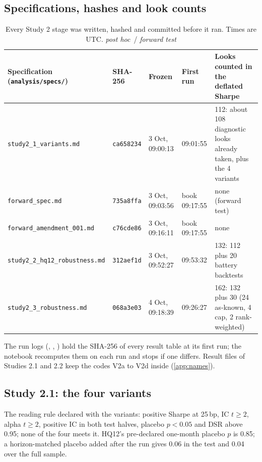 \documentclass[11pt,letterpaper]{article}
\newcommand{\fit}[1]{\resizebox{\ifdim\width>\linewidth\linewidth\else\width\fi}{!}{#1}}
\newcommand{\tagp}{{\footnotesize\itshape post hoc}}
\newcommand{\tagf}{{\footnotesize\itshape forward test}}
\begin{document}
\subsection*{Specifications, hashes and look counts}
\begin{table}[H]
\centering\footnotesize
\caption{Every Study 2 stage was written, hashed and committed before it ran. Times are UTC. \hfill\tagp\ / \tagf}
\label{tab:specs}
\begin{tabularx}{\textwidth}{@{}l l l l X@{}}
\toprule
Specification (\texttt{analysis/specs/}) & SHA-256 & Frozen & First run & Looks counted in the deflated Sharpe \\
\midrule
\texttt{study2\_1\_variants.md} & \texttt{ca658234} & 3 Oct, 09:00:13 & 09:01:55 & 112: about 108 diagnostic looks already taken, plus the 4 variants \\ %
\texttt{forward\_spec.md} & \texttt{735a8ffa} & 3 Oct, 09:03:56 & book 09:17:55 & none (forward test) \\ %
\texttt{forward\_amendment\_001.md} & \texttt{c76cde86} & 3 Oct, 09:16:11 & book 09:17:55 & none \\ %
\texttt{study2\_2\_hq12\_robustness.md} & \texttt{312aef1d} & 3 Oct, 09:52:27 & 09:53:32 & 132: 112 plus 20 battery backtests \\ %
\texttt{study2\_3\_robustness.md} & \texttt{068a3e03} & 4 Oct, 09:18:39 & 09:26:27 & 162: 132 plus 30 (24 as-known, 4 cap, 2 rank-weighted) \\ %
\bottomrule
\end{tabularx}
\end{table}
The run logs (,
, ) hold the SHA-256 of every
result table at its first run; the notebook recomputes them on each run and
stops if one differs. Result files of Studies 2.1 and 2.2 keep the codes V2a to
V2d inside (\cref{app:names}).

\subsection*{Study 2.1: the four variants}
\begin{table}[H]
\centering\footnotesize
\caption{Post-hoc variants on revised data: net Sharpe by window and test statistics at 10\,bp. Test figures are the test slice of a continuous run from May 2004 (A3's ledger starts from an empty book in November 2014). IC, alpha $t$ and placebo are one-month statistics with 6 Newey--West lags; DSR counts 112 looks as independent trials, a rough deflation since the looks are correlated. \hfill\tagp} %
\label{tab:v2}
\fit{}
\end{table}
The reading rule declared with the variants: positive Sharpe at 25\,bp, IC
$t\ge2$, alpha $t\ge2$, positive IC in both test halves, placebo $p<0.05$ and
DSR above 0.95; none of the four meets it. %
HQ12's pre-declared one-month placebo $p$ is 0.85; a horizon-matched placebo
added after the run gives 0.06 in the test and 0.04 over the full sample. %
\end{document}
